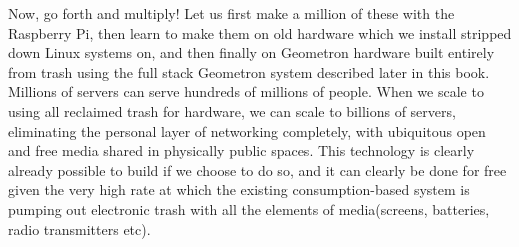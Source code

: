 Now, go forth and multiply!  Let us first make a million of these with the Raspberry Pi, then learn to make them on old hardware which we install stripped down Linux systems on, and then finally on Geometron hardware built entirely from trash using the full stack Geometron system described later in this book.  Millions of servers can serve hundreds of millions of people.  When we scale to using all reclaimed trash for hardware, we can scale to billions of servers, eliminating the personal layer of networking completely, with ubiquitous open and free media shared in physically public spaces.  This technology is clearly already possible to build if we choose to do so, and it can clearly be done for free given the very high rate at which the existing consumption-based system is pumping out electronic trash with all the elements of media(screens, batteries, radio transmitters etc).



